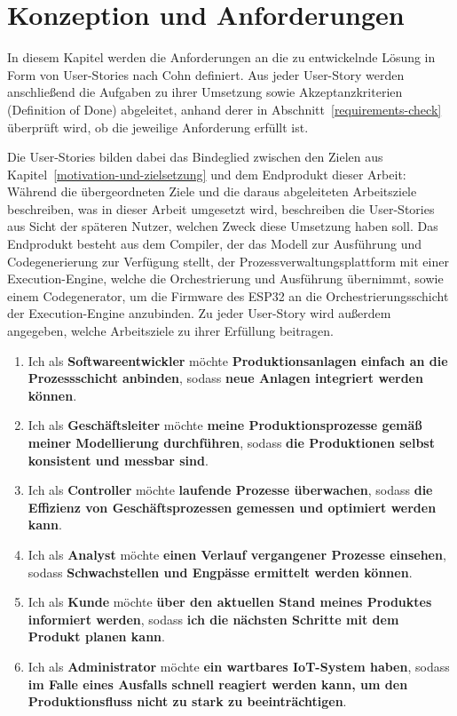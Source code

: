 \chapter{Konzeption und Anforderungen}
\label{analyse-und-konzeption}

In diesem Kapitel werden die Anforderungen an die zu entwickelnde Lösung in Form von 
User-Stories nach Cohn \cite{cohn_user_2004} definiert. Aus jeder User-Story werden 
anschließend die Aufgaben zu ihrer Umsetzung sowie Akzeptanzkriterien (Definition of Done) 
abgeleitet, anhand derer in Abschnitt~\ref{requirements-check} überprüft wird, ob die 
jeweilige Anforderung erfüllt ist.

\noindent Die User-Stories bilden dabei das Bindeglied zwischen den Zielen aus 
Kapitel~\ref{motivation-und-zielsetzung} und dem Endprodukt dieser Arbeit: Während die 
übergeordneten Ziele und die daraus abgeleiteten Arbeitsziele beschreiben, was in dieser 
Arbeit umgesetzt wird, beschreiben die User-Stories aus Sicht der späteren Nutzer, welchen 
Zweck diese Umsetzung haben soll. Das Endprodukt besteht aus dem Compiler, der 
das Modell zur Ausführung und Codegenerierung zur Verfügung stellt, der 
Prozessverwaltungsplattform mit einer Execution-Engine, welche die Orchestrierung und Ausführung übernimmt,
sowie einem Codegenerator, um die Firmware des ESP32 an die Orchestrierungsschicht der Execution-Engine anzubinden. Zu jeder User-Story wird außerdem angegeben, 
welche Arbeitsziele zu ihrer Erfüllung beitragen.

\label{requirements}

\begin{enumerate}[label=\Alph*)]
    \item Ich als \textbf{Softwareentwickler} möchte \textbf{Produktionsanlagen einfach an die Prozessschicht anbinden},
    sodass \textbf{neue Anlagen integriert werden können}.

    \item Ich als \textbf{Geschäftsleiter} möchte \textbf{meine Produktionsprozesse gemäß meiner Modellierung durchführen},
    sodass \textbf{die Produktionen selbst konsistent und messbar sind}.

    \item Ich als \textbf{Controller} möchte \textbf{laufende Prozesse überwachen}, sodass \textbf{die Effizienz von Geschäftsprozessen 
    gemessen und optimiert werden kann}.

    \item Ich als \textbf{Analyst} möchte \textbf{einen Verlauf vergangener Prozesse einsehen}, sodass \textbf{Schwachstellen und Engpässe
    ermittelt werden können}.

    \item Ich als \textbf{Kunde} möchte \textbf{über den aktuellen Stand meines Produktes informiert werden}, sodass \textbf{ich die nächsten
    Schritte mit dem Produkt planen kann}.

    \item Ich als \textbf{Administrator} möchte \textbf{ein wartbares IoT-System haben}, sodass \textbf{im Falle eines Ausfalls schnell reagiert
    werden kann, um den Produktionsfluss nicht zu stark zu beeinträchtigen}.
\end{enumerate}


